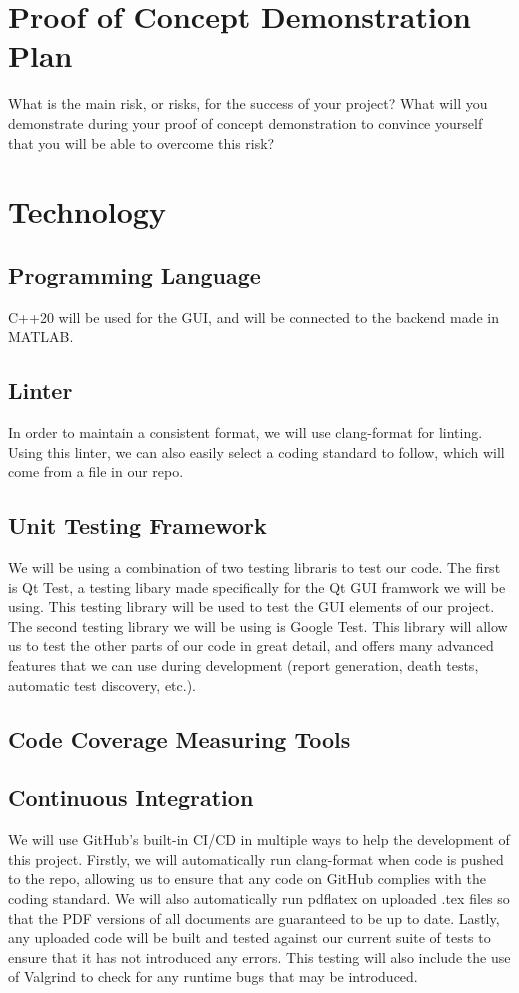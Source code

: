 \documentclass{article}
\begin{document}
\section{Proof of Concept Demonstration Plan}

What is the main risk, or risks, for the success of your project?  What will you
demonstrate during your proof of concept demonstration to convince yourself that
you will be able to overcome this risk?

\section{Technology}

\subsection{Programming Language}
C++20 will be used for the GUI, and will be connected to the backend made in MATLAB.

\subsection{Linter}
In order to maintain a consistent format, we will use clang-format for linting. Using this linter, 
we can also easily select a coding standard to follow, which will come from a file in our repo.

\subsection{Unit Testing Framework}
We will be using a combination of two testing libraris to test our code. The first is Qt Test, a testing libary made specifically for the Qt GUI framwork we will be using. This testing library will be used to test the GUI elements of our project.
The second testing library we will be using is Google Test. This library will allow us to test the other parts of our code in great detail, and offers many advanced features that we can use during development (report generation, death tests, automatic test discovery, etc.).

\subsection{Code Coverage Measuring Tools}

\subsection{Continuous Integration}
We will use GitHub's built-in CI/CD in multiple ways to help the development of this project. Firstly, we will automatically run clang-format when code is pushed to the repo, allowing us to ensure that any code on GitHub complies with the coding standard.
We will also automatically run pdflatex on uploaded .tex files so that the PDF versions of all documents are guaranteed to be up to date. Lastly, any uploaded code will be built and tested against our current suite of tests to ensure that it has not introduced any errors.
This testing will also include the use of Valgrind to check for any runtime bugs that may be introduced.
\end{document}

